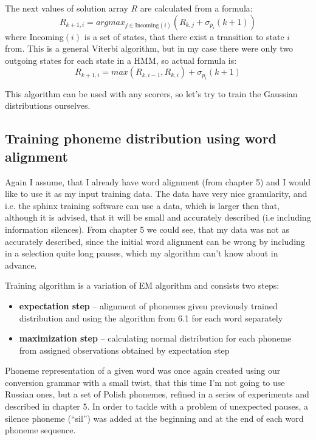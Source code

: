 \documentclass[12pt,a4paper,english]{article}
\begin{document}
The next values of solution array $R$ are calculated from a formula:
\begin{equation}
    R_{k+1, i} = argmax_{j \in \text{Incoming$(i)$}} (R_{k,j} + \sigma_{p_i}(k+1))
\end{equation}
where Incoming$(i)$ is a set of states, that there exist a transition to state $i$ from. \newline
This is a general Viterbi algorithm, but in my case there were only two outgoing states for each state in a HMM, so actual formula is:
\begin{equation}
    R_{k+1, i} = max(R_{k, i-1}, R_{k, i}) + \sigma_{p_i}(k+1)
\end{equation}

This algorithm can be used with any scorers, so let's try to train the Gaussian distributions ourselves.

\newpage
\subsection{Training phoneme distribution using word alignment}

Again I assume, that I already have word alignment (from chapter 5) and I would like to use it as my input training data. The data have very nice granularity,
and i.e. the sphinx training software can use a data, which is larger then that, although it is advised, that it will be small and accurately described (i.e including information silences). \newline
From chapter 5 we could see, that my data was not as accurately described, since the initial word alignment can be wrong by including in a selection quite long pauses, which my algorithm can't know about in advance. \newline

Training algorithm is a variation of EM algorithm and consists two steps:
\begin{itemize}
    \item \textbf{expectation step} – alignment of phonemes given previously trained distribution and using the algorithm from 6.1 for each word separately
    \item \textbf{maximization step} – calculating normal distribution for each phoneme from assigned observations obtained by expectation step
\end{itemize}

Phoneme representation of a given word was once again created using our conversion grammar with a small twist, that this time I'm not going to use Russian ones, but a set of Polish phonemes, refined in a series of experiments and described in chapter 5. \newline
In order to tackle with a problem of unexpected pauses, a silence phoneme (“sil”) was added at the beginning and at the end of each word phoneme sequence. \newline
\end{document}
